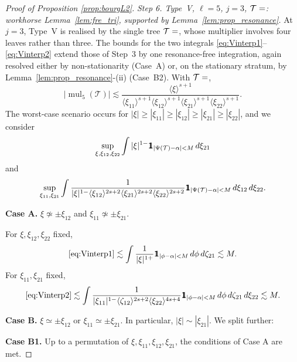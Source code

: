 \documentclass[a4paper,
11pt,  reqno]{amsart}
\makeatletter
\newcommand{\mathbbm}[1]{\mathchoice%
    {\hbox{\sffamily 1\kern-.40em 1}}%
    {\hbox{\sffamily 1\kern-.40em 1}}%
    {\hbox{\scriptsize\sffamily 1\kern-.30em 1}}%
    {\hbox{\tiny\sffamily 1\kern-.25em 1}}}%
\newcommand{\jap}[1]{\langle #1 \rangle}
\newcommand{\5}{\textup{V}}
\newcommand{\noi}{\noindent}
\newcommand{\ind}{\mathbbm 1}
\theoremstyle{remark}
\newcommand{\TT}{\mathcal{T}}
\DeclareMathOperator{\mul}{mul}
\def\<#1>{\csname MH@symb@#1\endcsname}
\numberwithin{equation}{section}
\numberwithin{theorem}{section}
\makeatother
\begin{document}
\begin{proof}[Proof of Proposition \ref{prop:bourgL2}]
\medskip
\noi\textit{Step 6. Type~V, $\ell=5$, $j=3$, $\TT=\<33>$: workhorse Lemma~\ref{lem:fre_tri}, supported by Lemma~\ref{lem:prop_resonance}.}
At $j=3$, Type~V is realised by the single tree $\TT=\<33>$, whose multiplier involves four leaves rather than three. The bounds for the two integrals \eqref{eq:Vinterp1}--\eqref{eq:Vinterp2} extend those of Step~3 by one resonance-free integration, again resolved either by non-stationarity (Case~A) or, on the stationary stratum, by Lemma~\ref{lem:prop_resonance}-(ii) (Case~B2).
With $\TT=\<33>$,
$$
|\mul_5(\TT)|\lesssim \frac{\jap{\xi}^{s+1}}{\jap{\xi_{11}}^{s+1}\jap{\xi_{12}}^{s+1}\jap{\xi_{21}}^{s+1}\jap{\xi_{22}}^{s+1}}.
$$
The worst-case scenario occurs for $|\xi|\ge |\xi_{11}|\ge |\xi_{12}|\ge |\xi_{21}|\ge |\xi_{22}|$, and we consider
\begin{equation}\label{eq:Vinterp1}
\sup_{\xi, \xi_{12}, \xi_{22}}\int |\xi|^{1-} \ind_{|\Psi(\TT)-\alpha|<M} \,d\xi_{21}
\end{equation}
and
\begin{equation}\label{eq:Vinterp2}
\sup_{\xi_{11}, \xi_{21}}\int \frac{1}{|\xi|^{1-}\jap{\xi_{12}}^{2s+2}\jap{\xi_{21}}^{2s+2}\jap{\xi_{22}}^{2s+2}}\ind_{|\Psi(\TT)-\alpha|<M} \,d\xi_{12}\,d\xi_{22}.
\end{equation}

\smallskip
\noi\textbf{Case A.} $\xi\not\simeq \pm \xi_{12}$ and $\xi_{11}\not\simeq \pm\xi_{21}$.

\noi For $\xi, \xi_{12}, \xi_{22}$ fixed,
\begin{equation}\label{eq:estVinterp1}
\eqref{eq:Vinterp1} \lesssim \int \frac{1}{|\xi|^{1+}} \ind_{|\phi-\alpha|<M} \,d\phi\,  d\zeta_{21} \lesssim M.
\end{equation}
For $\xi_{11}, \xi_{21}$ fixed,
\begin{equation}\label{eq:estVinterp2}
\eqref{eq:Vinterp2} \lesssim \int \frac{1}{|\xi_{11}|^{1-}\jap{\zeta_{12}}^{2s+2}\jap{\xi_{22}}^{4s+4}} \ind_{|\phi-\alpha|<M}\, d\phi\, d\zeta_{21}\,d\xi_{22} \lesssim M.
\end{equation}

\smallskip
\noi\textbf{Case B.} $\xi\simeq \pm \xi_{12}$ or $\xi_{11}\simeq \pm\xi_{21}$. In particular, $|\xi|\sim |\xi_{21}|$. We split further:

\smallskip
\noi\textbf{Case B1.} Up to a permutation of $\xi, \xi_{11}, \xi_{12}, \xi_{21}$, the conditions of Case A are met.


\end{proof}
\end{document}

